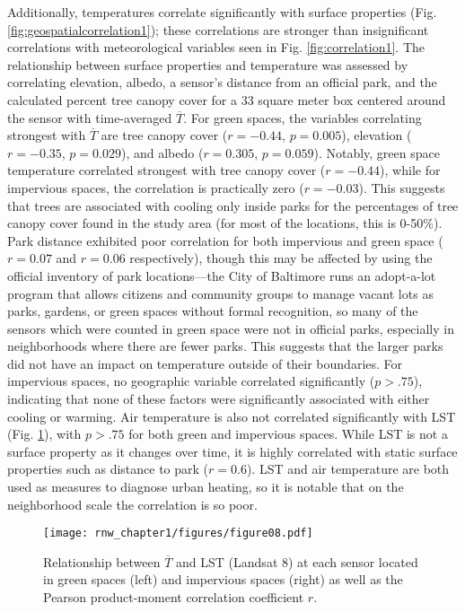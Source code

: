 Additionally, temperatures correlate significantly with surface properties (Fig. \ref{fig:geospatialcorrelation1}); these correlations are stronger than insignificant correlations with meteorological variables seen in Fig. \ref{fig:correlation1}.
The relationship between surface properties and temperature was assessed by correlating elevation, albedo, a sensor's distance from an official park, and the calculated percent tree canopy cover for a 33 square meter box centered around the sensor with time-averaged $\overline{T}$.
For green spaces, the variables correlating strongest with $\overline{T}$ are tree canopy cover ($r=-0.44$, $p=0.005$), elevation ($r=-0.35$, $p=0.029$), and albedo ($r=0.305$, $p=0.059$).
Notably, green space temperature correlated strongest with tree canopy cover ($r=-0.44$), while for impervious spaces, the correlation is practically zero ($r=-0.03$). This suggests that trees are associated with cooling only inside parks for the percentages of tree canopy cover found in the study area (for most of the locations, this is 0-50\%). 
Park distance exhibited poor correlation for both impervious and green space ($r=0.07$ and $r=0.06$ respectively), though this may be affected by using the official inventory of park locations---the City of Baltimore runs an adopt-a-lot program that allows citizens and community groups to manage vacant lots as parks, gardens, or green spaces without formal recognition, so many of the sensors which were counted in green space were not in official parks, especially in neighborhoods where there are fewer parks. This suggests that the larger parks did not have an impact on temperature outside of their boundaries. 
For impervious spaces, no geographic variable correlated significantly ($p >.75$), indicating that none of these factors were significantly associated with either cooling or warming. 
 Air temperature is also not correlated significantly with LST (Fig. \ref{fig:lst1}), with $p>.75$ for both green and impervious spaces. While LST is not a surface property as it changes over time, it is highly correlated with static surface properties such as distance to park ($r=0.6$). LST and air temperature are both used as measures to diagnose urban heating, so it is notable that on the neighborhood scale the correlation is so poor. 
 
 \begin{figure}
\noindent\texttt{[image: rnw\_chapter1/figures/figure08.pdf]}
\caption{Relationship between $\overline{T}$ and LST (Landsat 8) at each sensor located in green spaces (left) and impervious spaces (right) as well as the Pearson product-moment correlation coefficient $r$.} 
\label{fig:lst1}
\end{figure}

